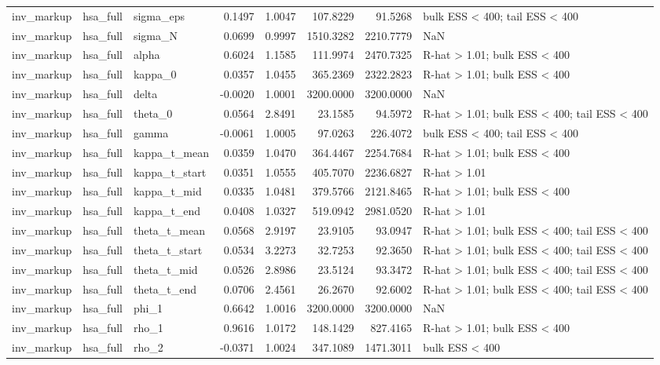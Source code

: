 \begin{tabular}{lllrrrrl}
inv\_markup & hsa\_full & sigma\_eps & 0.1497 & 1.0047 & 107.8229 & 91.5268 & bulk ESS < 400; tail ESS < 400 \\
inv\_markup & hsa\_full & sigma\_N & 0.0699 & 0.9997 & 1510.3282 & 2210.7779 & NaN \\
inv\_markup & hsa\_full & alpha & 0.6024 & 1.1585 & 111.9974 & 2470.7325 & R-hat > 1.01; bulk ESS < 400 \\
inv\_markup & hsa\_full & kappa\_0 & 0.0357 & 1.0455 & 365.2369 & 2322.2823 & R-hat > 1.01; bulk ESS < 400 \\
inv\_markup & hsa\_full & delta & -0.0020 & 1.0001 & 3200.0000 & 3200.0000 & NaN \\
inv\_markup & hsa\_full & theta\_0 & 0.0564 & 2.8491 & 23.1585 & 94.5972 & R-hat > 1.01; bulk ESS < 400; tail ESS < 400 \\
inv\_markup & hsa\_full & gamma & -0.0061 & 1.0005 & 97.0263 & 226.4072 & bulk ESS < 400; tail ESS < 400 \\
inv\_markup & hsa\_full & kappa\_t\_mean & 0.0359 & 1.0470 & 364.4467 & 2254.7684 & R-hat > 1.01; bulk ESS < 400 \\
inv\_markup & hsa\_full & kappa\_t\_start & 0.0351 & 1.0555 & 405.7070 & 2236.6827 & R-hat > 1.01 \\
inv\_markup & hsa\_full & kappa\_t\_mid & 0.0335 & 1.0481 & 379.5766 & 2121.8465 & R-hat > 1.01; bulk ESS < 400 \\
inv\_markup & hsa\_full & kappa\_t\_end & 0.0408 & 1.0327 & 519.0942 & 2981.0520 & R-hat > 1.01 \\
inv\_markup & hsa\_full & theta\_t\_mean & 0.0568 & 2.9197 & 23.9105 & 93.0947 & R-hat > 1.01; bulk ESS < 400; tail ESS < 400 \\
inv\_markup & hsa\_full & theta\_t\_start & 0.0534 & 3.2273 & 32.7253 & 92.3650 & R-hat > 1.01; bulk ESS < 400; tail ESS < 400 \\
inv\_markup & hsa\_full & theta\_t\_mid & 0.0526 & 2.8986 & 23.5124 & 93.3472 & R-hat > 1.01; bulk ESS < 400; tail ESS < 400 \\
inv\_markup & hsa\_full & theta\_t\_end & 0.0706 & 2.4561 & 26.2670 & 92.6002 & R-hat > 1.01; bulk ESS < 400; tail ESS < 400 \\
inv\_markup & hsa\_full & phi\_1 & 0.6642 & 1.0016 & 3200.0000 & 3200.0000 & NaN \\
inv\_markup & hsa\_full & rho\_1 & 0.9616 & 1.0172 & 148.1429 & 827.4165 & R-hat > 1.01; bulk ESS < 400 \\
inv\_markup & hsa\_full & rho\_2 & -0.0371 & 1.0024 & 347.1089 & 1471.3011 & bulk ESS < 400 \\

\end{tabular}
